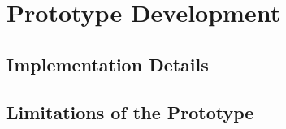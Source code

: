 \section{Prototype Development}

\subsection{Implementation Details}

\subsection{Limitations of the Prototype}
